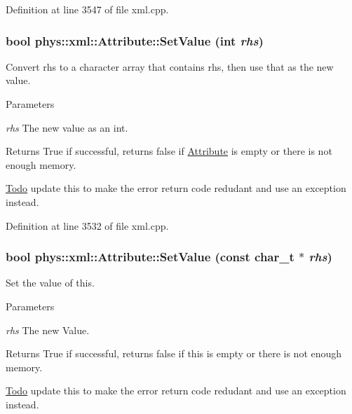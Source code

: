 Definition at line 3547 of file xml.cpp.

\hypertarget{classphys_1_1xml_1_1Attribute_a693f7bd8015866c3c4979101c343ce50}{
\subsubsection[{SetValue}]{\setlength{\rightskip}{0pt plus 5cm}bool phys::xml::Attribute::SetValue (int {\em rhs})}}
\label{da/ddf/classphys_1_1xml_1_1Attribute_a693f7bd8015866c3c4979101c343ce50}


Convert rhs to a character array that contains rhs, then use that as the new value. 


\begin{DoxyParams}{Parameters}
\item[{\em rhs}]The new value as an int. \end{DoxyParams}
\begin{DoxyReturn}{Returns}
True if successful, returns false if \hyperlink{classphys_1_1xml_1_1Attribute}{Attribute} is empty or there is not enough memory. 
\end{DoxyReturn}
\begin{Desc}
\item[\hyperlink{todo__todo000038}{Todo}]update this to make the error return code redudant and use an exception instead. \end{Desc}


Definition at line 3532 of file xml.cpp.

\hypertarget{classphys_1_1xml_1_1Attribute_a470512fcd8b4f7609319bf85df100aaa}{
\subsubsection[{SetValue}]{\setlength{\rightskip}{0pt plus 5cm}bool phys::xml::Attribute::SetValue (const char\_\-t $\ast$ {\em rhs})}}
\label{da/ddf/classphys_1_1xml_1_1Attribute_a470512fcd8b4f7609319bf85df100aaa}


Set the value of this. 


\begin{DoxyParams}{Parameters}
\item[{\em rhs}]The new Value. \end{DoxyParams}
\begin{DoxyReturn}{Returns}
True if successful, returns false if this is empty or there is not enough memory. 
\end{DoxyReturn}
\begin{Desc}
\item[\hyperlink{todo__todo000037}{Todo}]update this to make the error return code redudant and use an exception instead. \end{Desc}


